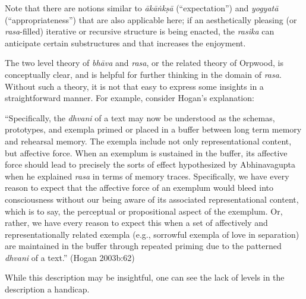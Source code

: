 Note that there are notions similar to \textsl{ākāṅkṣā} (“expectation”) and \textsl{yogyatā} (“appropriateness”) that are also applicable here; if an aesthetically pleasing (or \textsl{rasa}-filled) iterative or recursive structure is being enacted, the \textsl{rasika} can anticipate certain substructures and that increases the enjoyment.
\vskip 2.2pt

The two level theory of \textsl{bhāva} and \textsl{rasa}, or the related theory of Orpwood, is conceptually clear, and is helpful for further thinking in the domain of \textsl{rasa}. Without such a theory, it is not that easy to express some insights in a straightforward manner. For example, consider Hogan’s explanation: 
\bigskip

\begin{myquote}
“Specifically, the \textsl{dhvani} of a text may now be understood as the schemas, prototypes, and exempla primed or placed in a buffer between long term memory and rehearsal memory. The exempla include not only representational content, but affective force. When an exemplum is sustained in the buffer, its affective force should lead to precisely the sorts of effect hypothesized by Abhinavagupta when he explained \textsl{rasa} in terms of memory traces. Specifically, we have every reason to expect that the affective force of an exemplum would bleed into consciousness without our being aware of its associated representational content, which is to say, the perceptual or propositional aspect of the exemplum. Or, rather, we have every reason to expect this when a set of affectively and representationally related exempla (e.g., sorrowful exempla of love in separation) are maintained in the buffer through repeated priming due to the patterned \textsl{dhvani} of a text.” 
\hfill(Hogan 2003b:62)
\end{myquote}

While this description may be insightful, one can see the lack of levels in the description a handicap.

